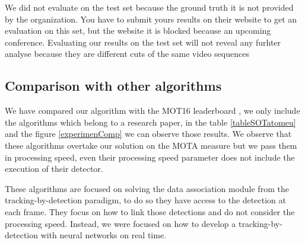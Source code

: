 We did not evaluate on the test set because the ground truth it is not provided by the organization. You have to submit yours results on their website to get an evaluation on this set, but the website it is blocked because an upcoming conference. Evaluating our results on the test set will not reveal any furhter analyse because they are different cuts of the same video sequences


\subsection{Comparison with other algorithms}

%

We have compared our algorithm with the MOT16 leaderboard \cite{motResults}, we only include the algorithms which belong to a research paper, in the table \ref{tableSOTatomeu} and the figure \ref{experimenComp} we can observe those results. We observe that these algorithms overtake our solution on the MOTA measure but we pass them in processing speed, even their processing speed parameter does not include the execution of their detector.

These algorithms are focused on solving the data association module from the tracking-by-detection paradigm, to do so they have access to the detection at each frame. They focus on how to link those detections and do not consider the processing speed. Instead, we were focused on how to develop a tracking-by-detection with neural networks on real time.
 

